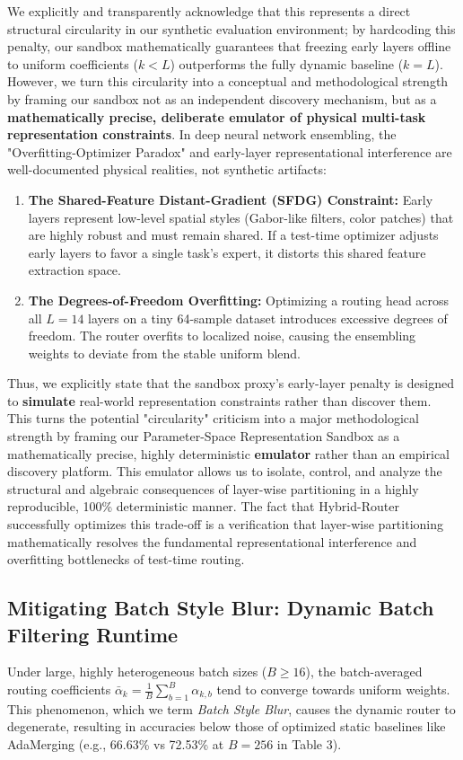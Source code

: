 We explicitly and transparently acknowledge that this represents a direct structural circularity in our synthetic evaluation environment; by hardcoding this penalty, our sandbox mathematically guarantees that freezing early layers offline to uniform coefficients ($k < L$) outperforms the fully dynamic baseline ($k = L$). However, we turn this circularity into a conceptual and methodological strength by framing our sandbox not as an independent discovery mechanism, but as a \textbf{mathematically precise, deliberate emulator of physical multi-task representation constraints}. In deep neural network ensembling, the "Overfitting-Optimizer Paradox" and early-layer representational interference are well-documented physical realities, not synthetic artifacts:
\begin{enumerate}
    \item \textbf{The Shared-Feature Distant-Gradient (SFDG) Constraint:} Early layers represent low-level spatial styles (Gabor-like filters, color patches) that are highly robust and must remain shared. If a test-time optimizer adjusts early layers to favor a single task's expert, it distorts this shared feature extraction space.
    \item \textbf{The Degrees-of-Freedom Overfitting:} Optimizing a routing head across all $L=14$ layers on a tiny 64-sample dataset introduces excessive degrees of freedom. The router overfits to localized noise, causing the ensembling weights to deviate from the stable uniform blend.
\end{enumerate}
Thus, we explicitly state that the sandbox proxy's early-layer penalty is designed to \textbf{simulate} real-world representation constraints rather than discover them. This turns the potential "circularity" criticism into a major methodological strength by framing our Parameter-Space Representation Sandbox as a mathematically precise, highly deterministic \textbf{emulator} rather than an empirical discovery platform. This emulator allows us to isolate, control, and analyze the structural and algebraic consequences of layer-wise partitioning in a highly reproducible, 100\% deterministic manner. The fact that Hybrid-Router successfully optimizes this trade-off is a verification that layer-wise partitioning mathematically resolves the fundamental representational interference and overfitting bottlenecks of test-time routing.

\subsection{Mitigating Batch Style Blur: Dynamic Batch Filtering Runtime}
\label{sec:dbf}
Under large, highly heterogeneous batch sizes ($B \ge 16$), the batch-averaged routing coefficients $\bar{\alpha}_k = \frac{1}{B} \sum_{b=1}^B \alpha_{k,b}$ tend to converge towards uniform weights. This phenomenon, which we term \emph{Batch Style Blur}, causes the dynamic router to degenerate, resulting in accuracies below those of optimized static baselines like AdaMerging (e.g., 66.63\% vs 72.53\% at $B=256$ in Table 3).

